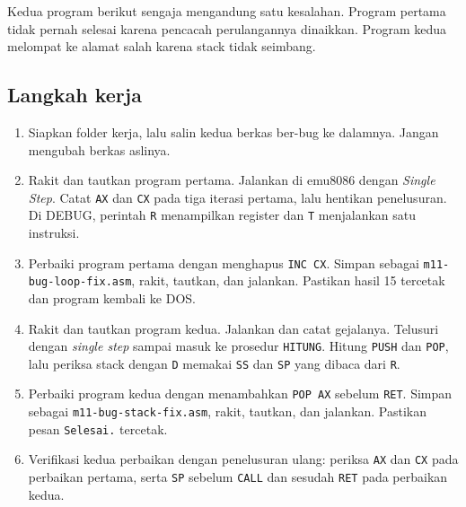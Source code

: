 Kedua program berikut sengaja mengandung satu kesalahan. Program
pertama tidak pernah selesai karena pencacah perulangannya dinaikkan.
Program kedua melompat ke alamat salah karena stack tidak seimbang.





\subsection{Langkah kerja}

\begin{enumerate}
    \item Siapkan folder kerja, lalu salin kedua berkas ber-bug ke
          dalamnya. Jangan mengubah berkas aslinya.
    \item Rakit dan tautkan program pertama. Jalankan di emu8086
          dengan \emph{Single Step}. Catat \texttt{AX} dan
          \texttt{CX} pada tiga iterasi pertama, lalu hentikan
          penelusuran. Di DEBUG, perintah \texttt{R} menampilkan
          register dan \texttt{T} menjalankan satu instruksi.
    \item Perbaiki program pertama dengan menghapus \texttt{INC CX}.
          Simpan sebagai \texttt{m11-bug-loop-\allowbreak fix.asm},
          rakit, tautkan, dan jalankan. Pastikan hasil 15 tercetak dan
          program kembali ke DOS.
    \item Rakit dan tautkan program kedua. Jalankan dan catat
          gejalanya. Telusuri dengan \emph{single step} sampai masuk
          ke prosedur \texttt{HITUNG}. Hitung \texttt{PUSH} dan
          \texttt{POP}, lalu periksa stack dengan \texttt{D} memakai
          \texttt{SS} dan \texttt{SP} yang dibaca dari \texttt{R}.
    \item Perbaiki program kedua dengan menambahkan \texttt{POP AX}
          sebelum \texttt{RET}. Simpan sebagai
          \texttt{m11-bug-stack-\allowbreak fix.asm}, rakit, tautkan,
          dan jalankan. Pastikan pesan \texttt{Selesai.} tercetak.
    \item Verifikasi kedua perbaikan dengan penelusuran ulang:
          periksa \texttt{AX} dan \texttt{CX} pada perbaikan pertama,
          serta \texttt{SP} sebelum \texttt{CALL} dan sesudah
          \texttt{RET} pada perbaikan kedua.
\end{enumerate}

